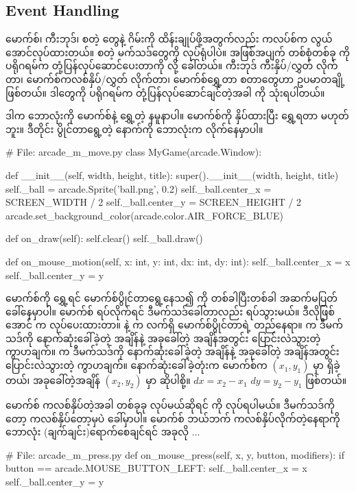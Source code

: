\subsection*{Event Handling}
မောက်စ်၊ ကီးဘုဒ်၊  စတဲ့  တွေနဲ့ ဂိမ်းကို ထိန်းချုပ်ဖို့အတွက်လည်း  ကလပ်စ်က လွယ်အောင်လုပ်ထားတယ်။ \fEn{,} \fEn{,}  စတဲ့ မက်သဒ်တွေကို  လုပ်ရုံပါပဲ။ အဖြစ်အပျက် တစ်စုံတစ်ခု  ကို ပရိုဂရမ်က တုံ့ပြန်လုပ်ဆောင်ပေးတာကို  လို့ ခေါ်တယ်။ ကီးဘုဒ် ကီးနှိပ်/လွှတ် လိုက်တာ၊ မောက်စ်ကလစ်နှိပ်/လွှတ် လိုက်တာ၊ မောက်စ်ရွှေ့တာ စတာတွေဟာ  ဥပမာတချို့ ဖြစ်တယ်။ ဒါတွေကို ပရိုဂရမ်က တုံ့ပြန်လုပ်ဆောင်ချင်တဲ့အခါ  ကို သုံးရပါတယ်။

ဒါက ဘောလုံးကို မောက်စ်နဲ့ ရွှေ့တဲ့ နမူနာပါ။ မောက်စ်ကို နှိပ်ထားပြီး ရွှေ့ရတာ  မဟုတ်ဘူး။ ဒီတိုင်း ပွိုင်တာရွေ့တဲ့ နောက်ကို ဘောလုံးက လိုက်နေမှာပါ။
%
\begin{py}
# File: arcade_m_move.py
class MyGame(arcade.Window):

    def __init__(self, width, height, title):
        super().__init__(width, height, title)
        self._ball = arcade.Sprite('ball.png', 0.2)
        self._ball.center_x = SCREEN_WIDTH / 2
        self._ball.center_y = SCREEN_HEIGHT / 2
        arcade.set_background_color(arcade.color.AIR_FORCE_BLUE)

    def on_draw(self):
        self.clear()
        self._ball.draw()

    def on_mouse_motion(self, x: int, y: int, dx: int, dy: int):
        self._ball.center_x = x
        self._ball.center_y = y
\end{py}
%
မောက်စ်ကို ရွှေ့ရင် မောက်စ်ပွိုင်တာရွေ့နေသ၍  ကို တစ်ခါပြီးတစ်ခါ အဆက်မပြတ် ခေါ်နေမှာပါ။ မောက်စ် ရပ်လိုက်ရင် ဒီမက်သဒ်ခေါ်တာလည်း ရပ်သွားမယ်။ ဒီလိုဖြစ်အောင်  က လုပ်ပေးထားတာ။  နဲ့  က လက်ရှိ မောက်စ်ပွိုင်တာရဲ့ တည်နေရာ။  က ဒီမက်သဒ်ကို နောက်ဆုံးခေါ်ခဲ့တဲ့ အချိန်နဲ့ အခုခေါ်တဲ့ အချိန်အတွင်း ပြောင်းလဲသွားတဲ့  ကွာဟချက်။  က ဒီမက်သဒ်ကို နောက်ဆုံးခေါ်ခဲ့တဲ့ အချိန်နဲ့ အခုခေါ်တဲ့ အချိန်အတွင်း ပြောင်းလဲသွားတဲ့  ကွာဟချက်။ နောက်ဆုံးခေါ်ခဲ့တုံးက မောက်စ်က $(x_1, y_1)$ မှာ ရှိခဲ့တယ်၊ အခုခေါ်တဲ့အချိန် $(x_2, y_2)$ မှာ ဆိုပါစို့။  $dx= x_2 - x_1$\fEn{,} $dy= y_2 - y_1$ ဖြစ်တယ်။

မောက်စ် ကလစ်နှိပ်တဲ့အခါ တစ်ခုခု လုပ်မယ်ဆိုရင်  ကို  လုပ်ရပါမယ်။ ဒီမက်သဒ်ကိုတော့ ကလစ်နှိပ်တော့မှပဲ ခေါ်မှာပါ။  မောက်စ် ဘယ်ဘက် ကလစ်နှိပ်လိုက်တဲ့နေရာကို ဘောလုံး (ချက်ချင်း)ရောက်စေချင်ရင် အခုလို $\ldots$
%
\begin{py}
# File: arcade_m_press.py
def on_mouse_press(self, x, y, button, modifiers):
    if button == arcade.MOUSE_BUTTON_LEFT:
        self._ball.center_x = x
        self._ball.center_y = y
\end{py}
%

